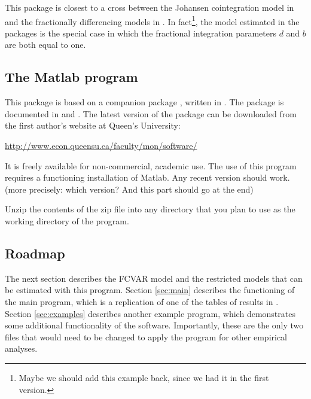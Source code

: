 \documentclass[article]{jss}
\begin{document}
This package is closest to a cross between the Johansen cointegration model in  and the fractionally differencing models in . In fact\footnote{Maybe we should add this example back, since we had it in the first version.}, the model estimated in the  packages is the special case in which the fractional integration parameters $d$ and $b$ are both equal to one. 



\subsection{The  Matlab program}

This  package is based on a companion package , written in . 
The  package is documented in \cite{Nielsen2016} and \cite{Nielsen2013}. 
The latest version of the package can be downloaded from the first author's website at Queen's University:
% 
\begin{center} \url{http://www.econ.queensu.ca/faculty/mon/software/}
\end{center}
% 
\noindent It is freely available for non-commercial, academic use. 
% 
% 
The use of this program requires a functioning installation of Matlab. Any recent version should work.  
(more precisely: which version? And this part should go at the end)

Unzip the contents of the zip file into any directory that you plan to use as the working directory of the program.

\subsection{Roadmap}

The next section describes the FCVAR model and the restricted models that can be estimated with this program. Section \ref{sec:main} describes the functioning of the main program, which is a replication of one of the tables of results in \cite{JNP2014}. Section \ref{sec:examples} describes another example program, which demonstrates some additional functionality of the software. Importantly, these are the only two files that would need to be changed to apply the program for other empirical analyses. 
\end{document}
